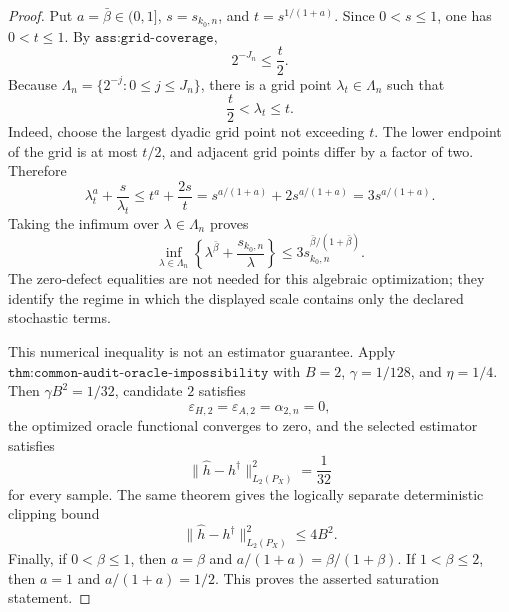 \begin{proof}
Put \(a=\bar\beta\in(0,1]\), \(s=s_{k_0,n}\), and \(t=s^{1/(1+a)}\). Since \(0<s\le1\), one has \(0<t\le1\). By \(\texttt{ass:grid-coverage}\),
\[
 2^{-J_n}\le \frac{t}{2}.
\]
Because \(\Lambda_n=\{2^{-j}:0\le j\le J_n\}\), there is a grid point \(\lambda_t\in\Lambda_n\) such that
\[
 \frac{t}{2}<\lambda_t\le t.
\]
Indeed, choose the largest dyadic grid point not exceeding \(t\). The lower endpoint of the grid is at most \(t/2\), and adjacent grid points differ by a factor of two. Therefore
\[
 \lambda_t^a+\frac{s}{\lambda_t}
 \le t^a+\frac{2s}{t}
 =s^{a/(1+a)}+2s^{a/(1+a)}
 =3s^{a/(1+a)}.
\]
Taking the infimum over \(\lambda\in\Lambda_n\) proves
\[
 \inf_{\lambda\in\Lambda_n}
 \left\{\lambda^{\bar\beta}+\frac{s_{k_0,n}}{\lambda}\right\}
 \le3s_{k_0,n}^{\bar\beta/(1+\bar\beta)}.
\]
The zero-defect equalities are not needed for this algebraic optimization; they identify the regime in which the displayed scale contains only the declared stochastic terms.

This numerical inequality is not an estimator guarantee. Apply \(\texttt{thm:common-audit-oracle-impossibility}\) with \(B=2\), \(\gamma=1/128\), and \(\eta=1/4\). Then \(\gamma B^2=1/32\), candidate \(2\) satisfies
\[
 \varepsilon_{H,2}=\varepsilon_{A,2}=\alpha_{2,n}=0,
\]
the optimized oracle functional converges to zero, and the selected estimator satisfies
\[
 \|\widehat h-h^\dagger\|_{L_2(P_X)}^2=\frac{1}{32}
\]
for every sample. The same theorem gives the logically separate deterministic clipping bound
\[
 \|\widehat h-h^\dagger\|_{L_2(P_X)}^2\le4B^2.
\]
Finally, if \(0<\beta\le1\), then \(a=\beta\) and \(a/(1+a)=\beta/(1+\beta)\). If \(1<\beta\le2\), then \(a=1\) and \(a/(1+a)=1/2\). This proves the asserted saturation statement.
\end{proof}